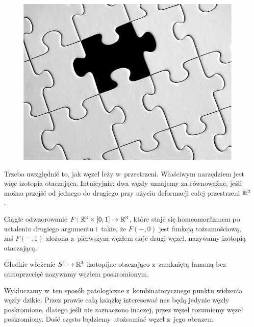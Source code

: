 \begin{figure}[H]
\begin{minipage}[b]{.23\linewidth}
    \end{minipage}
    \begin{minipage}[b]{.23\linewidth}
        \centering
        \includegraphics[width=\linewidth]{../data/missing.jpg}
    \end{minipage}
\end{figure}

Trzeba uwzględnić to, jak węzeł leży w~przestrzeni.
Właściwym narzędziem jest więc izotopia otaczająca.
Intuicyjnie: dwa węzły uznajemy za równoważne,
jeśli można przejść od jednego do drugiego przy użyciu deformacji całej przestrzeni $\mathbb R^3$.

\begin{definition} \label{def_ambient_isotopy}
    Ciągłe odwzorowanie $F \colon \mathbb R^3 \times [0,1] \to \mathbb R^3$,
    które staje się homeomorfizmem po ustaleniu drugiego argumentu i~takie,
    że $F(-, 0)$ jest funkcją tożsamościową,
    zaś $F(-, 1)$ złożona z~pierwszym węzłem daje drugi węzeł,
    nazywamy izotopią otaczającą.
\end{definition}

\begin{definition}[węzeł]
    \label{def:knot}
    Gładkie włożenie $S^1 \to \mathbb R^3$ izotopijne otaczająco z~zamkniętą łamaną bez samoprzecięć nazywamy węzłem poskromionym.
\end{definition}

Wykluczamy w~ten sposób patologiczne z~kombinatorycznego punktu widzenia węzły dzikie.
Przez prawie całą książkę interesować nas będą jedynie węzły poskromione,
dlatego jeśli nie zaznaczono inaczej, przez węzeł rozumiemy węzeł poskromiony.
Dość często będziemy utożsamiać węzeł z~jego obrazem.

